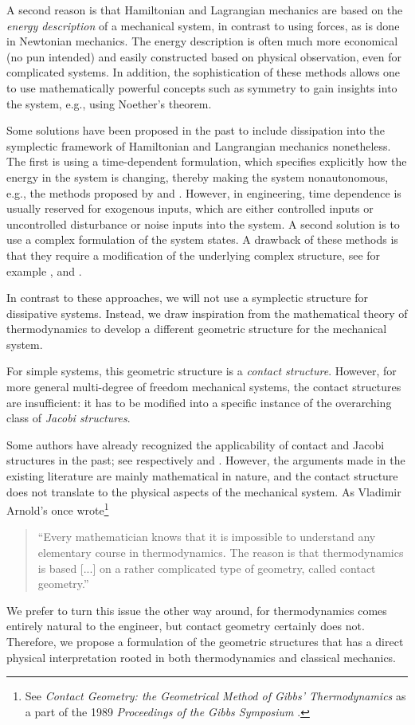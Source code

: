 A second reason is that Hamiltonian and Lagrangian mechanics are based on the \emph{energy description} of a mechanical system, in contrast to using forces, as is done in Newtonian mechanics. The energy description is often much more economical (no pun intended) and easily constructed based on physical observation, even for complicated systems. In addition, the sophistication of these methods allows one to use mathematically powerful concepts such as symmetry to gain insights into the system, e.g., using Noether's theorem.

Some solutions have been proposed in the past to include dissipation into the symplectic framework of Hamiltonian and Langrangian mechanics nonetheless. The first is using a time-dependent formulation, which specifies explicitly how the energy in the system is changing, thereby making the system nonautonomous, e.g., the methods proposed by \citet{Caldirola1941} and \citet{Kanai1948}. However, in engineering, time dependence is usually reserved for exogenous inputs, which are either controlled inputs or uncontrolled disturbance or noise inputs into the system. A second solution is to use a complex formulation of the system states. A drawback of these methods is that they require a modification of the underlying complex structure, see for example \citet{Hutters2020}, \citet{Dedene1980} and \citet{Rajeev2007}.

In contrast to these approaches, we will not use a symplectic structure for dissipative systems. Instead, we draw inspiration from the mathematical theory of thermodynamics to develop a different geometric structure for the mechanical system.

For simple systems, this geometric structure is a \emph{contact structure}. However, for more general multi-degree of freedom mechanical systems, the contact structures are insufficient: it has to be modified into a specific instance of the overarching class of \emph{Jacobi structures}. 

Some authors have already recognized the applicability of contact and Jacobi structures in the past; see respectively \citet{Bravetti2017} and \citet{ciaglia2018}. However, the arguments made in the existing literature are mainly mathematical in nature, and the contact structure does not translate to the physical aspects of the mechanical system. As Vladimir Arnold's once wrote\footnote{See \emph{Contact Geometry: the Geometrical Method of Gibbs' Thermodynamics} as a part of the 1989 \emph{Proceedings of the Gibbs Symposium} \cite[p. 163]{Arnold1989b}.}
\begin{quote}
``Every mathematician knows that it is impossible to understand any elementary course in thermodynamics. The reason is that thermodynamics is based [...] on a rather complicated type of geometry, called contact geometry.''
\end{quote}
We prefer to turn this issue the other way around, for thermodynamics comes entirely natural to the engineer, but contact geometry certainly does not. Therefore, we propose a formulation of the geometric structures that has a direct physical interpretation rooted in both thermodynamics and classical mechanics.

